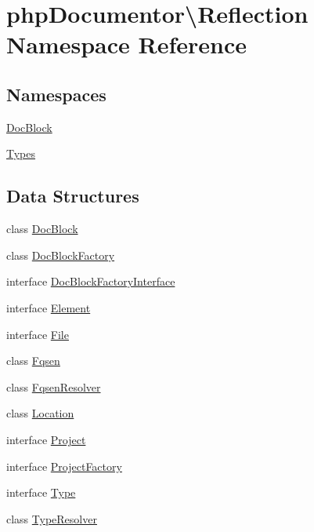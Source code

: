 \hypertarget{namespacephp_documentor_1_1_reflection}{}\section{php\+Documentor\textbackslash{}Reflection Namespace Reference}
\label{namespacephp_documentor_1_1_reflection}
\subsection*{Namespaces}
\begin{DoxyCompactItemize}
\item 
 \mbox{\hyperlink{namespacephp_documentor_1_1_reflection_1_1_doc_block}{Doc\+Block}}
\item 
 \mbox{\hyperlink{namespacephp_documentor_1_1_reflection_1_1_types}{Types}}
\end{DoxyCompactItemize}
\subsection*{Data Structures}
\begin{DoxyCompactItemize}
\item 
class \mbox{\hyperlink{classphp_documentor_1_1_reflection_1_1_doc_block}{Doc\+Block}}
\item 
class \mbox{\hyperlink{classphp_documentor_1_1_reflection_1_1_doc_block_factory}{Doc\+Block\+Factory}}
\item 
interface \mbox{\hyperlink{interfacephp_documentor_1_1_reflection_1_1_doc_block_factory_interface}{Doc\+Block\+Factory\+Interface}}
\item 
interface \mbox{\hyperlink{interfacephp_documentor_1_1_reflection_1_1_element}{Element}}
\item 
interface \mbox{\hyperlink{interfacephp_documentor_1_1_reflection_1_1_file}{File}}
\item 
class \mbox{\hyperlink{classphp_documentor_1_1_reflection_1_1_fqsen}{Fqsen}}
\item 
class \mbox{\hyperlink{classphp_documentor_1_1_reflection_1_1_fqsen_resolver}{Fqsen\+Resolver}}
\item 
class \mbox{\hyperlink{classphp_documentor_1_1_reflection_1_1_location}{Location}}
\item 
interface \mbox{\hyperlink{interfacephp_documentor_1_1_reflection_1_1_project}{Project}}
\item 
interface \mbox{\hyperlink{interfacephp_documentor_1_1_reflection_1_1_project_factory}{Project\+Factory}}
\item 
interface \mbox{\hyperlink{interfacephp_documentor_1_1_reflection_1_1_type}{Type}}
\item 
class \mbox{\hyperlink{classphp_documentor_1_1_reflection_1_1_type_resolver}{Type\+Resolver}}
\end{DoxyCompactItemize}


